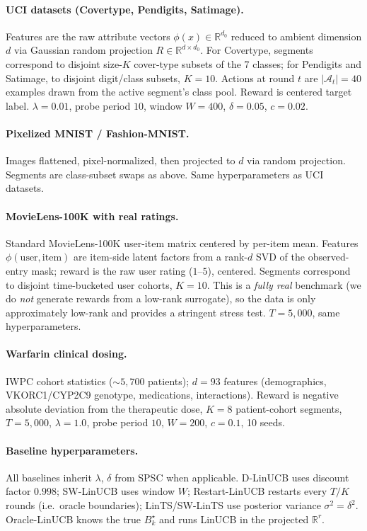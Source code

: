 \documentclass{article}
\newcommand{\R}{\mathbb{R}}
\newcommand{\cA}{\mathcal{A}}
\begin{document}
\paragraph{UCI datasets (Covertype, Pendigits, Satimage).}
Features are the raw attribute vectors $\phi(x)\in\R^{d_0}$ reduced to
ambient dimension $d$ via Gaussian random projection
$R\in\R^{d\times d_0}$. For Covertype, segments correspond to disjoint
size-$K$ cover-type subsets of the 7 classes; for Pendigits and
Satimage, to disjoint digit/class subsets, $K{=}10$. Actions at round
$t$ are $|\cA_t|=40$ examples drawn from the active segment's class
pool. Reward is centered target label. $\lambda{=}0.01$, probe
period $10$, window $W{=}400$, $\delta{=}0.05$, $c{=}0.02$.

\paragraph{Pixelized MNIST / Fashion-MNIST.}
Images flattened, pixel-normalized, then projected to $d$ via random
projection. Segments are class-subset swaps as above. Same
hyperparameters as UCI datasets.

\paragraph{MovieLens-100K with real ratings.}
Standard MovieLens-100K user-item matrix centered by per-item mean.
Features $\phi(\text{user},\text{item})$ are item-side latent
factors from a rank-$d$ SVD of the observed-entry mask; reward is
the raw user rating ($1$--$5$), centered. Segments correspond to
disjoint time-bucketed user cohorts, $K{=}10$. This is a
\emph{fully real} benchmark (we do \emph{not} generate rewards from
a low-rank surrogate), so the data is only approximately low-rank and
provides a stringent stress test. $T{=}5{,}000$, same hyperparameters.

\paragraph{Warfarin clinical dosing.}
IWPC cohort statistics (${\sim}5{,}700$ patients); $d{=}93$ features
(demographics, VKORC1/CYP2C9 genotype, medications, interactions).
Reward is negative absolute deviation from the therapeutic dose,
$K{=}8$ patient-cohort segments, $T{=}5{,}000$, $\lambda{=}1.0$, probe
period $10$, $W{=}200$, $c{=}0.1$, 10 seeds.

\paragraph{Baseline hyperparameters.}
All baselines inherit $\lambda$, $\delta$ from SPSC when applicable.
D-LinUCB uses discount factor $0.998$; SW-LinUCB uses window $W$;
Restart-LinUCB restarts every $T/K$ rounds (i.e.\ oracle boundaries);
LinTS/SW-LinTS use posterior variance $\sigma^2 = \delta^2$.
Oracle-LinUCB knows the true $B_k^\star$ and runs LinUCB in the
projected $\R^r$.
\end{document}
